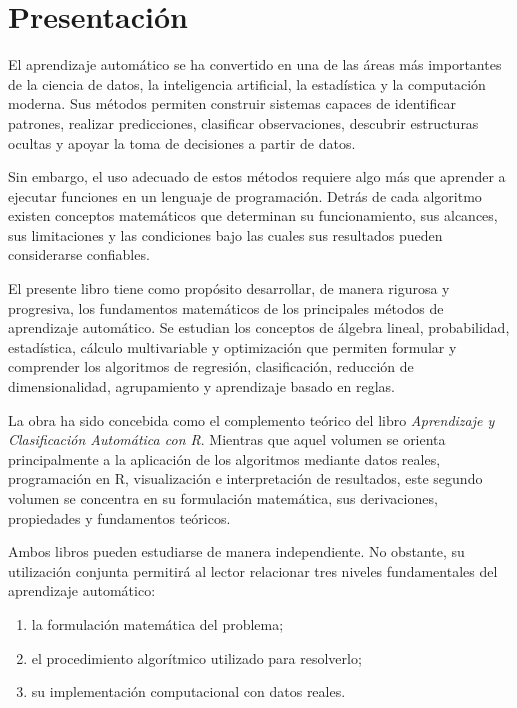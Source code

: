 \documentclass[
  spanish,
  10.5pt,
  letterpaper,
  DIV=11,
  numbers=noendperiod,
  oneside,
  open=any]{scrreprt}
\providecommand{\tightlist}{%
  \setlength{\itemsep}{0pt}\setlength{\parskip}{0pt}}
\theoremstyle{definition}
\theoremstyle{definition}
\theoremstyle{plain}
\theoremstyle{remark}
\begin{document}

\chapter*{Presentación}\label{presentaciuxf3n}


El aprendizaje automático se ha convertido en una de las áreas más
importantes de la ciencia de datos, la inteligencia artificial, la
estadística y la computación moderna. Sus métodos permiten construir
sistemas capaces de identificar patrones, realizar predicciones,
clasificar observaciones, descubrir estructuras ocultas y apoyar la toma
de decisiones a partir de datos.

Sin embargo, el uso adecuado de estos métodos requiere algo más que
aprender a ejecutar funciones en un lenguaje de programación. Detrás de
cada algoritmo existen conceptos matemáticos que determinan su
funcionamiento, sus alcances, sus limitaciones y las condiciones bajo
las cuales sus resultados pueden considerarse confiables.

El presente libro tiene como propósito desarrollar, de manera rigurosa y
progresiva, los fundamentos matemáticos de los principales métodos de
aprendizaje automático. Se estudian los conceptos de álgebra lineal,
probabilidad, estadística, cálculo multivariable y optimización que
permiten formular y comprender los algoritmos de regresión,
clasificación, reducción de dimensionalidad, agrupamiento y aprendizaje
basado en reglas.

La obra ha sido concebida como el complemento teórico del libro
\emph{Aprendizaje y Clasificación Automática con R}. Mientras que aquel
volumen se orienta principalmente a la aplicación de los algoritmos
mediante datos reales, programación en R, visualización e interpretación
de resultados, este segundo volumen se concentra en su formulación
matemática, sus derivaciones, propiedades y fundamentos teóricos.

Ambos libros pueden estudiarse de manera independiente. No obstante, su
utilización conjunta permitirá al lector relacionar tres niveles
fundamentales del aprendizaje automático:

\begin{enumerate}
\def\labelenumi{\arabic{enumi}.}
\tightlist
\item
  la formulación matemática del problema;
\item
  el procedimiento algorítmico utilizado para resolverlo;
\item
  su implementación computacional con datos reales.
\end{enumerate}
\end{document}
